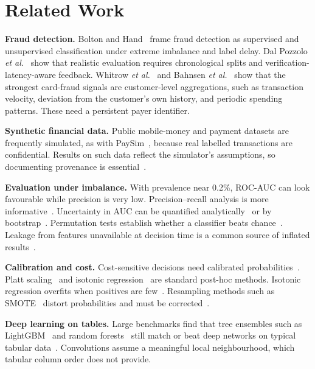 \documentclass[conference]{IEEEtran}
\begin{document}
\section{Related Work}
\textbf{Fraud detection.} Bolton and Hand~\cite{bolton2002} frame fraud detection as supervised and unsupervised classification under extreme imbalance and label delay. Dal Pozzolo \emph{et al.}~\cite{dalpozzolo2018} show that realistic evaluation requires chronological splits and verification-latency-aware feedback. Whitrow \emph{et al.}~\cite{whitrow2009} and Bahnsen \emph{et al.}~\cite{bahnsen2016} show that the strongest card-fraud signals are customer-level aggregations, such as transaction velocity, deviation from the customer's own history, and periodic spending patterns. These need a persistent payer identifier.

\textbf{Synthetic financial data.} Public mobile-money and payment datasets are frequently simulated, as with PaySim~\cite{lopezrojas2016}, because real labelled transactions are confidential. Results on such data reflect the simulator's assumptions, so documenting provenance is essential~\cite{gebru2021,mitchell2019}.

\textbf{Evaluation under imbalance.} With prevalence near 0.2\%, ROC-AUC can look favourable while precision is very low. Precision--recall analysis is more informative~\cite{saito2015,davis2006}. Uncertainty in AUC can be quantified analytically~\cite{hanley1982,delong1988} or by bootstrap~\cite{efron1993}. Permutation tests establish whether a classifier beats chance~\cite{ojala2010}. Leakage from features unavailable at decision time is a common source of inflated results~\cite{kaufman2012}.

\textbf{Calibration and cost.} Cost-sensitive decisions need calibrated probabilities~\cite{elkan2001}. Platt scaling~\cite{platt1999} and isotonic regression~\cite{niculescu2005} are standard post-hoc methods. Isotonic regression overfits when positives are few~\cite{niculescu2005}. Resampling methods such as SMOTE~\cite{chawla2002} distort probabilities and must be corrected~\cite{dalpozzolo2015}.

\textbf{Deep learning on tables.} Large benchmarks find that tree ensembles such as LightGBM~\cite{ke2017} and random forests~\cite{breiman2001} still match or beat deep networks on typical tabular data~\cite{grinsztajn2022,shwartz2022}. Convolutions assume a meaningful local neighbourhood, which tabular column order does not provide.
\end{document}
